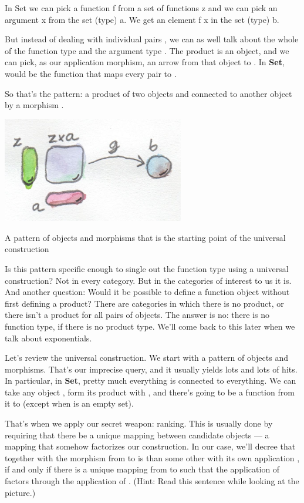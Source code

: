In Set we can pick a function f from a set of functions z and we can
pick an argument x from the set (type) a. We get an element f x in the
set (type) b.

But instead of dealing with individual pairs , we can as
well talk about the whole  of the function type 
and the argument type . The product  is an object,
and we can pick, as our application morphism, an arrow  from
that object to . In \textbf{Set},  would be the
function that maps every pair  to .

So that's the pattern: a product of two objects  and
 connected to another object  by a morphism
.

\hypertarget{attachment_4244}{}
\includegraphics[width=3.12500in]{images/functionpattern.jpg}

A pattern of objects and morphisms that is the starting point of the
universal construction

Is this pattern specific enough to single out the function type using a
universal construction? Not in every category. But in the categories of
interest to us it is. And another question: Would it be possible to
define a function object without first defining a product? There are
categories in which there is no product, or there isn't a product for
all pairs of objects. The answer is no: there is no function type, if
there is no product type. We'll come back to this later when we talk
about exponentials.

Let's review the universal construction. We start with a pattern of
objects and morphisms. That's our imprecise query, and it usually yields
lots and lots of hits. In particular, in \textbf{Set}, pretty much
everything is connected to everything. We can take any object
, form its product with , and there's going to be a
function from it to  (except when  is an empty set).

That's when we apply our secret weapon: ranking. This is usually done by
requiring that there be a unique mapping between candidate objects --- a
mapping that somehow factorizes our construction. In our case, we'll
decree that  together with the morphism  from
 to  is  than some other
 with its own application , if and
only if there is a unique mapping  from  to
 such that the application of  factors
through the application of . (Hint: Read this sentence while
looking at the picture.)

